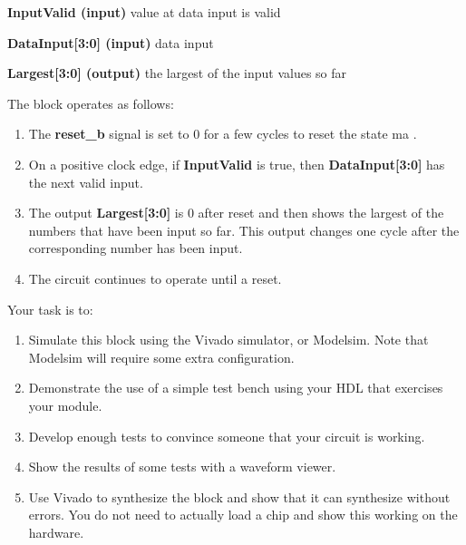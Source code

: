 \documentclass[11pt]{article}
\begin{document}
\textbf{InputValid (input)} value at data input is valid

\textbf{DataInput[3:0] (input)} data input

\textbf{Largest[3:0] (output)} the largest of the input values so far

\noindent
The block operates as follows:

\begin{enumerate}
    \item The \textbf{reset\_b} signal is set to 0 for a few cycles to reset the state ma
    \noindentchine.
    \item On a positive clock edge, if \textbf{InputValid} is true, then \textbf{DataInput[3:0]} has the next valid input.
    \item The output \textbf{Largest[3:0]} is 0 after reset and then shows the largest of the numbers that have been input so far. This output changes one cycle after the corresponding number has been input.
    \item The circuit continues to operate until a reset.
\end{enumerate}

\noindent
Your task is to:

\begin{enumerate}
    \item Simulate this block using the Vivado simulator, or Modelsim. Note that Modelsim will require some extra configuration.
    \item Demonstrate the use of a simple test bench using your HDL that exercises your module.
    \item Develop enough tests to convince someone that your circuit is working.
    \item Show the results of some tests with a waveform viewer.
    \item Use Vivado to synthesize the block and show that it can synthesize without errors. You do not need to actually load a chip and show this working on the hardware.
\end{enumerate}









\newpage
\printbibliography
\end{document}
